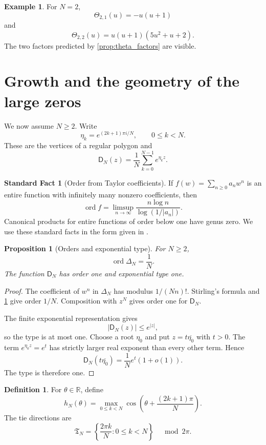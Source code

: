 \documentclass{aomart}
\newtheorem{proposition}[proposition]{Proposition}
\theoremstyle{definition}
\newtheorem{definition}[definition]{Definition}
\newtheorem{example}[example]{Example}
\newtheorem{standardfact}[standardfact]{Standard Fact}
\theoremstyle{remark}
\newcommand{\Dfun}{\mathsf D}
\newcommand{\Thetafun}{\mathsf\Theta}
\newcommand{\ord}{\operatorname{ord}}
\begin{document}
\begin{example}\label{ex:theta_even}
For $N=2$,
\[
\Thetafun_{2,1}(u)=-u(u+1)
\]
and
\[
\Thetafun_{2,2}(u)
=
u(u+1)(5u^2+u+2).
\]
The two factors predicted by \cref{prop:theta_factors} are visible.
\end{example}

\section{Growth and the geometry of the large zeros}\label{sec:zero_geometry}

We now assume $N\geq2$.  Write
\[
\eta_k=e^{(2k+1)\pi i/N},
\qquad 0\leq k<N.
\]
These are the vertices of a regular polygon and
\[
\Dfun_N(z)=\frac1N\sum_{k=0}^{N-1}e^{\eta_kz}.
\]

\begin{standardfact}[Order from Taylor coefficients]\label{sf:coefficient_order}
If $f(w)=\sum_{n\geq0}a_nw^n$ is an entire function with infinitely many nonzero coefficients, then
\[
\ord f
=
\limsup_{n\to\infty}
\frac{n\log n}{\log(1/|a_n|)}.
\]
Canonical products for entire functions of order below one have genus zero.  We use these standard facts in the form given in \cite{Boas1954,Titchmarsh1939}.
\end{standardfact}

\begin{proposition}[Orders and exponential type]\label{prop:orders}
For $N\geq2$,
\[
\ord\Delta_N=\frac1N.
\]
The function $\Dfun_N$ has order one and exponential type one.
\end{proposition}

\begin{proof}
The coefficient of $w^n$ in $\Delta_N$ has modulus $1/(Nn)!$.  Stirling's formula and \cref{sf:coefficient_order} give order $1/N$.  Composition with $z^N$ gives order one for $\Dfun_N$.

The finite exponential representation gives
\[
|\Dfun_N(z)|\leq e^{|z|},
\]
so the type is at most one.  Choose a root $\eta_0$ and put $z=t\overline{\eta_0}$ with $t>0$.  The term $e^{\eta_0z}=e^t$ has strictly larger real exponent than every other term.  Hence
\[
\Dfun_N(t\overline{\eta_0})
=
\frac1Ne^t(1+o(1)).
\]
The type is therefore one.
\end{proof}


\begin{definition}\label{def:indicator_polygon}
For $\theta\in\mathbb R$, define
\[
h_N(\theta)
=
\max_{0\leq k<N}
\cos\left(\theta+\frac{(2k+1)\pi}{N}\right).
\]
The tie directions are
\[
\mathfrak T_N
=
\left\{\frac{2\pi k}{N}:0\leq k<N\right\}
\quad\bmod 2\pi.
\]
\end{definition}
\end{document}

